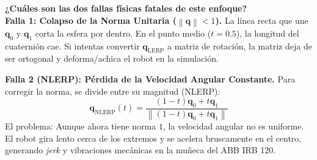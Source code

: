 \documentclass[11pt, a4paper]{article}
\begin{document}
\vspace{0.4cm}
\begin{center}
\end{center}

\textbf{¿Cuáles son las dos fallas físicas fatales de este enfoque?}\\
\textbf{Falla 1: Colapso de la Norma Unitaria ($\left\|\mathbf{q}\right\| < 1$).} La línea recta que une $\mathbf{q}_0$ y $\mathbf{q}_1$ corta la esfera por dentro. En el punto medio ($t = 0.5$), la longitud del cuaternión cae. Si intentas convertir $\mathbf{q}_{\text{LERP}}$ a matriz de rotación, la matriz deja de ser ortogonal y deforma/achica el robot en la simulación.

\textbf{Falla 2 (NLERP): Pérdida de la Velocidad Angular Constante.} Para corregir la norma, se divide entre su magnitud (NLERP):
\begin{equation*}
    \mathbf{q}_{\text{NLERP}}(t) = \frac{(1 - t)\mathbf{q}_0 + t\mathbf{q}_1}{\left\| (1 - t)\mathbf{q}_0 + t\mathbf{q}_1 \right\|}
\end{equation*}
El problema: Aunque ahora tiene norma $1$, la velocidad angular no es uniforme. El robot gira lento cerca de los extremos y se acelera bruscamente en el centro, generando \textit{jerk} y vibraciones mecánicas en la muñeca del ABB IRB 120.
\end{document}
